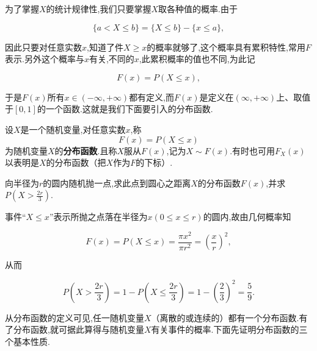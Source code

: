 为了掌握$ X $的统计规律性,我们只要掌握$ X $取各种值的概率.由于

\[
\{a < X \leq b \} = \{ X \leq b\} - \{x\leq a\},
\]

因此只要对任意实数$ x $,知道了件$ X\geq x $的概率就够了,这个概率具有累积特性,常用$ F $表示.另外这个概率与$ x $有关,不同的$ x $,此累积概率的值也不同,为此记

\[
  F(x) = P(X\leq x),
\]

于是$ F(x) $所有$ x\in(-\infty,+\infty) $都有定义,而$ F(x) $是定义在$ (\infty,+\infty ) $上、取值于$ [0,1] $的一个函数.这就是我们下面要引入的分布函数.

\begin{definition}{}{}
	设$ X $是一个随机变量,对任意实数$ x $,称
	\begin{equation}
	F(x)=P(X \leqslant x) \label{2.1.1}
	\end{equation}
	为随机变量$ X $的\textbf{分布函数}.且称$ X $服从$ F(x) $,记为$ X\sim F(x) $.有时也可用$F_{X}(x)$以表明是$ X $的分布函数（把$ X $作为$ F $的下标）.
\end{definition}

\begin{example}
	向半径为$ r $的圆内随机抛一点,求此点到圆心之距离$ X $的分布函数$ F(x) $,并求$P\left(X>\frac{2 r}{3}\right)$.
\end{example}

\begin{solution}
	事件“$ X\le x $”表示所抛之点落在半径为$x(0 \leqslant x \leqslant r)$的圆内,故由几何概率知
	
	\[
	F(x)=P(X \leqslant x)=\frac{\pi x^{2}}{\pi r^{2}}=\left(\frac{x}{r}\right)^{2},
	\]
	
	从而
	
	\[
	P\left(X>\frac{2 r}{3}\right)=1-P\left(X \leqslant \frac{2 r}{3}\right)=1-\left(\frac{2}{3}\right)^{2}=\frac{5}{9}.
	\]
\end{solution}
	



从分布函数的定义可见,任一随机变量$ X $（离散的或连续的）都有一个分布函数.有了分布函数,就可据此算得与随机变量$ X $有关事件的概率.下面先证明分布函数的三个基本性质.

